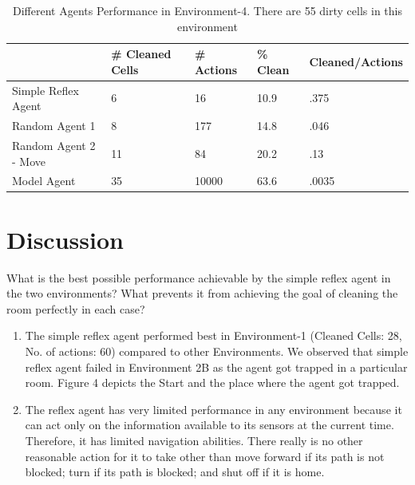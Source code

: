 \documentclass{article}
\newenvironment{Question}[2][Question]{\begin{trivlist}
\item[\hskip \labelsep {\bfseries #1}\hskip \labelsep {\bfseries #2.}]}{\end{trivlist}}
\begin{document}
\begin{table}[h!]
\centering
\caption{Different Agents Performance in Environment-4. There are 55 dirty cells in this environment}
\label{my-label}
\begin{tabular}{l|ll|ll}
\hline
                    & \# Cleaned Cells & \# Actions  & \% Clean & Cleaned/Actions \\ \hline
Simple Reflex Agent 		& 6                  & 16                  & 10.9     & .375            \\ \hline
Random Agent 1       	& 8	         	& 177                & 14.8       & .046            \\ 
Random Agent 2 - Move 	& 11 			& 84		& 20.2 	& .13			\\ \hline
Model Agent 		& 35                  & 10000                & 63.6       & .0035            \\ \hline
\end{tabular}
\end{table}

\section{Discussion}


\begin{Question}{3}What is the best possible performance achievable by the simple reflex agent in the two environments? What prevents it from achieving the goal of cleaning the room perfectly in each case?\\

\begin{enumerate}
\item The simple reflex agent performed best in Environment-1 (Cleaned Cells: 28, No. of actions: 60) compared to other  Environments.  We observed that simple reflex agent failed in Environment 2B as the agent got trapped in a particular room.  Figure 4 depicts the Start and the place where the agent got trapped.  
\item The reflex agent has very limited performance in any environment because it can act only on the information available to its sensors  at the current time. Therefore, it has limited navigation abilities. There really is no other reasonable action for it to take other than move forward if its path is not blocked; turn if its path is blocked; and shut off if it is home.
\end{enumerate}

\end{Question}
\end{document}
